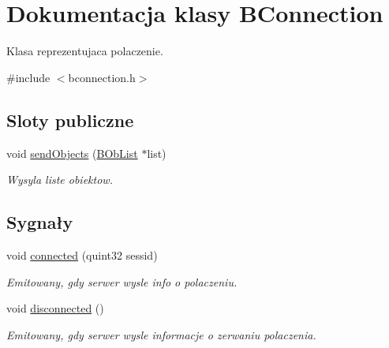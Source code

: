\hypertarget{class_b_connection}{
\section{Dokumentacja klasy BConnection}
\label{class_b_connection}
}


Klasa reprezentujaca polaczenie.  




{\ttfamily \#include $<$bconnection.h$>$}

\subsection*{Sloty publiczne}
\begin{DoxyCompactItemize}
\item 
void \hyperlink{class_b_connection_a348456770c1f73c004ea60d03fca1a41}{sendObjects} (\hyperlink{class_b_ob_list}{BObList} $\ast$list)
\begin{DoxyCompactList}\small\item\em Wysyla liste obiektow. \item\end{DoxyCompactList}\end{DoxyCompactItemize}
\subsection*{Sygnały}
\begin{DoxyCompactItemize}
\item 
void \hyperlink{class_b_connection_a90dca3f0343427e31bb4544a8accf56d}{connected} (quint32 sessid)
\begin{DoxyCompactList}\small\item\em Emitowany, gdy serwer wysle info o polaczeniu. \item\end{DoxyCompactList}\item 
\hypertarget{class_b_connection_a20fa85863f4cb396d3141e01d4928fd4}{
void \hyperlink{class_b_connection_a20fa85863f4cb396d3141e01d4928fd4}{disconnected} ()}
\label{class_b_connection_a20fa85863f4cb396d3141e01d4928fd4}

\begin{DoxyCompactList}\small\item\em Emitowany, gdy serwer wysle informacje o zerwaniu polaczenia. \item\end{DoxyCompactList}\end{DoxyCompactItemize}
